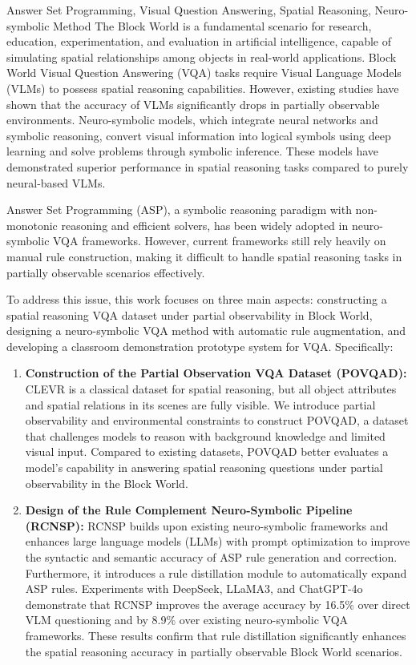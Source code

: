\begin{englishabstract}{Answer Set Programming, Visual Question Answering, Spatial Reasoning, Neuro-symbolic Method}
The Block World is a fundamental scenario for research, education, experimentation, and evaluation in artificial intelligence, capable of simulating spatial relationships among objects in real-world applications. Block World Visual Question Answering (VQA) tasks require Visual Language Models (VLMs) to possess spatial reasoning capabilities. However, existing studies have shown that the accuracy of VLMs significantly drops in partially observable environments. Neuro-symbolic models, which integrate neural networks and symbolic reasoning, convert visual information into logical symbols using deep learning and solve problems through symbolic inference. These models have demonstrated superior performance in spatial reasoning tasks compared to purely neural-based VLMs.

Answer Set Programming (ASP), a symbolic reasoning paradigm with non-monotonic reasoning and efficient solvers, has been widely adopted in neuro-symbolic VQA frameworks. However, current frameworks still rely heavily on manual rule construction, making it difficult to handle spatial reasoning tasks in partially observable scenarios effectively.

To address this issue, this work focuses on three main aspects: constructing a spatial reasoning VQA dataset under partial observability in Block World, designing a neuro-symbolic VQA method with automatic rule augmentation, and developing a classroom demonstration prototype system for VQA. Specifically:

\begin{enumerate}[nosep]
\item \textbf{Construction of the Partial Observation VQA Dataset (POVQAD):}  
CLEVR is a classical dataset for spatial reasoning, but all object attributes and spatial relations in its scenes are fully visible. We introduce partial observability and environmental constraints to construct POVQAD, a dataset that challenges models to reason with background knowledge and limited visual input. Compared to existing datasets, POVQAD better evaluates a model's capability in answering spatial reasoning questions under partial observability in the Block World.

\item \textbf{Design of the Rule Complement Neuro-Symbolic Pipeline (RCNSP):}  
RCNSP builds upon existing neuro-symbolic frameworks and enhances large language models (LLMs) with prompt optimization to improve the syntactic and semantic accuracy of ASP rule generation and correction. Furthermore, it introduces a rule distillation module to automatically expand ASP rules. Experiments with DeepSeek, LLaMA3, and ChatGPT-4o demonstrate that RCNSP improves the average accuracy by 16.5\% over direct VLM questioning and by 8.9\% over existing neuro-symbolic VQA frameworks. These results confirm that rule distillation significantly enhances the spatial reasoning accuracy in partially observable Block World scenarios.


\end{enumerate}
\end{englishabstract}
